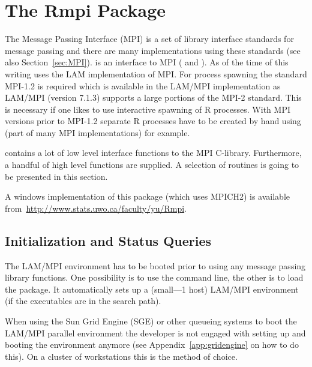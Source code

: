 \section{The Rmpi Package}
\label{sec:Rmpi}
The Message Passing Interface (MPI) is a set of library interface
standards for message passing and there are many implementations using
these standards (see also Section~\ref{sec:MPI}).
 is an interface to MPI (\cite{yu02Rmpi} and
\cite{yu06Rmpi}). As 
of the time of this writing  uses
the LAM implementation of MPI. For process spawning the standard
MPI-1.2 is required which is available in the LAM/MPI implementation 
as LAM/MPI (version 7.1.3) supports a large portions of the MPI-2
standard. This is necessary if one likes to use interactive spawning
of R processes. With MPI versions prior to MPI-1.2 separate R
processes have to be created by hand using  (part of many
MPI implementations) for example.

 contains a lot of low level interface functions to the MPI
C-library. 
Furthermore, a handful of high level functions are supplied. A
selection of routines is going to be presented in this section.


A windows implementation of this package (which uses MPICH2)
is available from~\url{http://www.stats.uwo.ca/faculty/yu/Rmpi}.

\subsection{Initialization and Status Queries}

The LAM/MPI environment has to be booted prior to using any
message passing library functions. One possibility is to use the
command line, the other is to load the  package. It automatically
sets up a (small---1 host) LAM/MPI environment (if the executables are
in the search path). 

When using the Sun Grid Engine (SGE) or other queueing systems to boot
the LAM/MPI parallel environment the developer is not engaged with
setting up and booting the environment anymore (see
Appendix~\ref{app:gridengine} on how to do this). On a cluster of
workstations this is the method of choice. 

